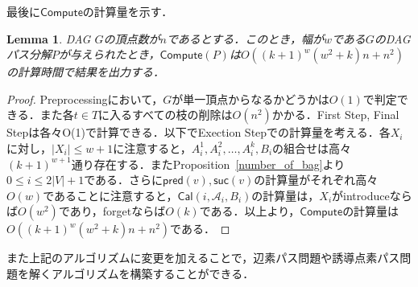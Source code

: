 \documentclass[master]{kuisthesis}		%
\theoremstyle{plain}
\newtheorem{lemma}{Lemma}
\theoremstyle{definition}
\begin{document}

最後に$\mathsf{Compute}$の計算量を示す．

\begin{lemma}
    DAG $G$の頂点数が$n$であるとする．このとき，幅が$w$である$G$のDAGパス分解$P$が与えられたとき，$\mathsf{Compute}(P)$は$O((k+1)^w(w^2+k)n+n^2)$の計算時間で結果を出力する．
\end{lemma}

\begin{proof}
    Preprocessingにおいて，$G$が単一頂点からなるかどうかは$O(1)$で判定できる．また各$t \in T$に入るすべての枝の削除は$O(n^2)$かかる．First Step, Final Stepは各々O(1)で計算できる．以下でExection Stepでの計算量を考える．各$X_i$に対し，$|X_i| \leq w+1$に注意すると，$A^1_i, A^2_i, \dots, A^k_i, B_i$の組合せは高々$(k+1)^{w+1}$通り存在する．またProposition~\ref{number_of_bag}より$0 \leq i \leq 2|V|+1$である．さらに$\mathsf{pred}(v), \mathsf{suc}(v)$の計算量がそれぞれ高々$O(w)$であることに注意すると，$\mathsf{Cal}(i, \mathscr{A}_i, B_i)$の計算量は，$X_i$がintroduceならば$O(w^2)$であり，forgetならば$O(k)$である．以上より，$\mathsf{Compute}$の計算量は$O((k+1)^w(w^2+k)n+n^2)$である．
\end{proof}

また上記のアルゴリズムに変更を加えることで，辺素パス問題や誘導点素パス問題を解くアルゴリズムを構築することができる．
\end{document}
